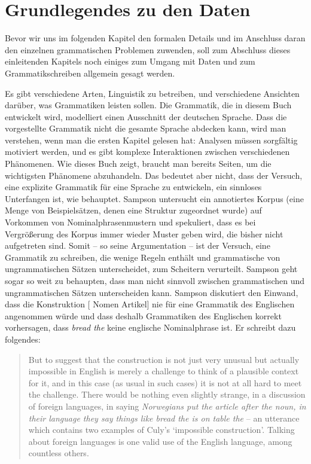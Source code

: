 \section{Grundlegendes zu den Daten}
\label{sec-grundlegendes-zu-daten}

Bevor wir uns im folgenden Kapitel den formalen Details und im Anschluss daran den einzelnen
grammatischen Problemen zuwenden, soll zum Abschluss dieses einleitenden Kapitels noch einiges zum
Umgang mit Daten und zum Grammatikschreiben allgemein gesagt werden.

Es gibt verschiedene Arten, Linguistik zu betreiben, und verschiedene Ansichten darüber,
was Grammatiken leisten sollen. Die Grammatik, die in diesem Buch entwickelt wird,
modelliert einen Ausschnitt der deutschen Sprache. Dass die vorgestellte Grammatik nicht die gesamte
Sprache abdecken kann, wird man verstehen, wenn man die ersten Kapitel gelesen hat:
Analysen müssen sorgfältig motiviert werden, und es gibt komplexe Interaktionen
zwischen verschiedenen Phänomenen. Wie dieses Buch zeigt, braucht man bereits \pageref{last-page-hpsg-teil} Seiten,
um die wichtigsten Phänomene abzuhandeln. Das bedeutet aber nicht, dass der Versuch, eine explizite
Grammatik für eine Sprache zu entwickeln, ein sinnloses Unterfangen ist, wie \zb 
\citet[Kapitel~10]{Sampson2001a-u} behauptet. Sampson untersucht ein annotiertes
Korpus (eine Menge von Beispielsätzen, denen eine Struktur zugeordnet wurde)
auf Vorkommen von Nominalphrasenmustern und spekuliert, dass es bei Vergrößerung des Korpus
immer wieder Muster geben wird, die bisher nicht aufgetreten sind. Somit -- so seine Argumentation --
ist der Versuch, eine Grammatik zu schreiben, die wenige Regeln enthält und grammatische
von ungrammatischen Sätzen unterscheidet, zum Scheitern verurteilt.
Sampson geht sogar so weit zu behaupten, dass man nicht sinnvoll zwischen grammatischen und
ungrammatischen Sätzen unterscheiden kann. Sampson diskutiert den Einwand, dass die Konstruktion
[ Nomen Artikel] nie für eine Grammatik des Englischen angenommen würde und dass deshalb
Grammatiken des Englischen korrekt vorhersagen, dass \emph{bread the} keine englische Nominalphrase ist.
Er schreibt dazu folgendes:
\begin{quote}
But to suggest that the construction is not just very unusual but actually impossible in English
is merely a challenge to think of a plausible context for it, and in this case (as usual in such cases)
it is not at all hard to meet the challenge. There would be nothing even slightly strange, in a discussion
of foreign languages, in saying \emph{Norwegians put the article after the noun, in their language
they say things like bread the is on table the} -- an utterance which contains two examples
of Culy's `impossible construction'. Talking about foreign languages is one valid use of the English
language, among countless others. \citep[]{Sampson2001a-u}
\end{quote}
